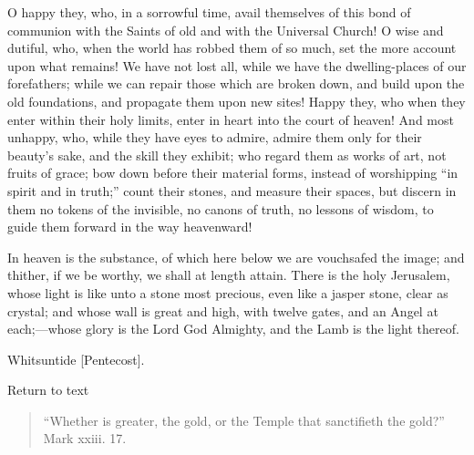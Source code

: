 O happy they, who, in a sorrowful time, avail themselves of this
bond of communion with the Saints of old and with the Universal
Church! O wise and dutiful, who, when the world has robbed them of so
much, set the more account upon what remains! We have not lost all,
while we have the dwelling-places of our forefathers; while we can
repair those which are broken down, and build upon the old
foundations, and propagate them upon new sites! Happy they, who when
they enter within their holy limits, enter in heart into the court of
heaven! And most unhappy, who, while they have eyes to admire, admire
them only for their beauty's sake, and the skill they exhibit; who
regard them as works of art, not fruits of grace; bow down before
their material forms, instead of worshipping ``in spirit and in
truth;'' count their stones, and measure their spaces, but discern in
them no tokens of the invisible, no canons of truth, no lessons of
wisdom, to guide them forward in the way heavenward!

In heaven is the substance, of which here below we are vouchsafed
the image; and thither, if we be worthy, we shall at length attain.
There is the holy Jerusalem, whose light is like unto a stone most
precious, even like a jasper stone, clear as crystal; and whose wall
is great and high, with twelve gates, and an Angel at each;—whose
glory is the Lord God Almighty, and the Lamb is the light thereof.


Whitsuntide [Pentecost].

Return to text


\begin{quote}

``Whether is greater, the gold, or the Temple that
sanctifieth the gold?'' Mark xxiii. 17.

\end{quote}

